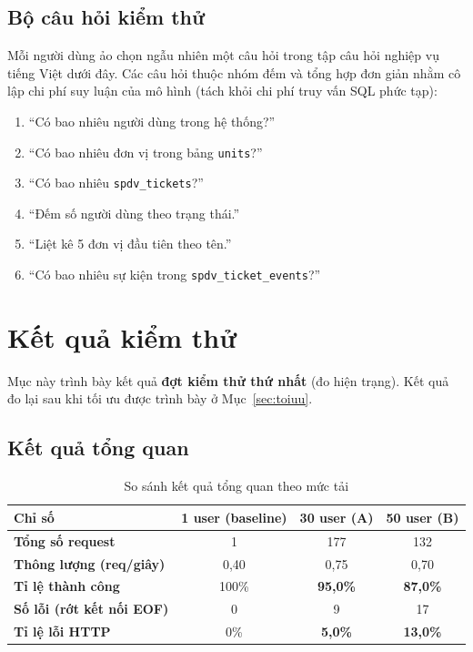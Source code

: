 \documentclass[12pt,a4paper]{article}
\newcommand{\ok}[1]{\textcolor{successgreen}{\bfseries #1}}
\newcommand{\warn}[1]{\textcolor{warnorange}{\bfseries #1}}
\newcommand{\bad}[1]{\textcolor{dangerred}{\bfseries #1}}
\begin{document}
\subsection{Bộ câu hỏi kiểm thử}

Mỗi người dùng ảo chọn ngẫu nhiên một câu hỏi trong tập câu hỏi nghiệp vụ tiếng
Việt dưới đây. Các câu hỏi thuộc nhóm đếm và tổng hợp đơn giản nhằm cô lập chi phí
suy luận của mô hình (tách khỏi chi phí truy vấn SQL phức tạp):

\begin{enumerate}
  \item ``Có bao nhiêu người dùng trong hệ thống?''
  \item ``Có bao nhiêu đơn vị trong bảng \texttt{units}?''
  \item ``Có bao nhiêu \texttt{spdv\_tickets}?''
  \item ``Đếm số người dùng theo trạng thái.''
  \item ``Liệt kê 5 đơn vị đầu tiên theo tên.''
  \item ``Có bao nhiêu sự kiện trong \texttt{spdv\_ticket\_events}?''
\end{enumerate}

\section{Kết quả kiểm thử}

Mục này trình bày kết quả \textbf{đợt kiểm thử thứ nhất} (đo hiện trạng). Kết quả
đo lại sau khi tối ưu được trình bày ở Mục~\ref{sec:toiuu}.

\subsection{Kết quả tổng quan}

\begin{table}[H]
\centering
\caption{So sánh kết quả tổng quan theo mức tải}
\begin{tabularx}{\textwidth}{>{\bfseries}Xccc}
\toprule
\rowcolor{lightblue}
Chỉ số & 1 user (baseline) & 30 user (A) & 50 user (B)\\
\midrule
Tổng số request        & 1     & 177 & 132\\
Thông lượng (req/giây)  & 0,40 & 0,75 & 0,70\\
Tỉ lệ thành công        & 100\% & \ok{95,0\%} & \warn{87,0\%}\\
Số lỗi (rớt kết nối EOF) & 0    & 9 & 17\\
Tỉ lệ lỗi HTTP          & 0\%   & \warn{5,0\%} & \bad{13,0\%}\\
\bottomrule
\end{tabularx}
\end{table}
\end{document}
